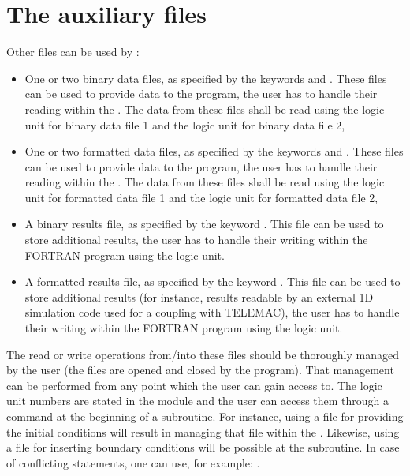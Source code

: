 \section{The auxiliary files}

Other files can be used by :

\begin{itemize}
\item One or two binary data files, as specified by the keywords
 and . These files can be
used to provide data to the program, the user has to handle their reading
within the . The data from these files shall be read using
the  logic unit for binary data file 1 and the 
logic unit for binary data file 2,

\item One or two formatted data files, as specified by the keywords
 and . These files
can be used to provide data to the program, the user has to handle their
reading within the . The data from these files shall be
read using the  logic unit for formatted data file 1 and the
 logic unit for formatted data file 2,

\item A binary results file, as specified by the keyword . This file can be used to store
additional results, the user has to handle their writing within the FORTRAN
program using the  logic unit.

\item A formatted results file, as specified by the keyword . This file can be used to store additional results (for instance,
results readable by an external 1D simulation code used for a coupling with
TELEMAC), the user has to handle their writing within the FORTRAN program using
the  logic unit.
\end{itemize}

The read or write operations from/into these files should be thoroughly managed
by the user (the files are opened and closed by the program). That management
can be performed from any point which the user can gain access to.
The logic unit numbers are stated in the 
module and the user can access them through a
 command at the beginning of a
subroutine. For instance, using a file for providing the initial conditions
will result in managing that file within the .
Likewise, using a file for inserting boundary conditions will be possible at
the  subroutine. In case of conflicting statements, one can use,
for example: .

